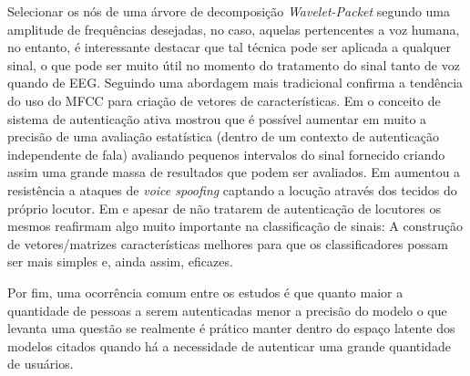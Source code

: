 Selecionar os nós de uma árvore de decomposição \textit{Wavelet-Packet} segundo uma amplitude de frequências desejadas, no caso, aquelas pertencentes a voz humana, no entanto, é interessante destacar que tal técnica pode ser aplicada a qualquer sinal, o que pode ser muito útil no momento do tratamento do sinal tanto de voz quando de EEG. Seguindo uma abordagem mais tradicional \cite{ali2022speech} confirma a tendência do uso do MFCC para criação de vetores de características. Em \cite{WOS:000525844000004} o conceito de sistema de autenticação ativa mostrou que é possível aumentar em muito a precisão de uma avaliação estatística (dentro de um contexto de autenticação independente de fala) avaliando pequenos intervalos do sinal fornecido criando assim uma grande massa de resultados que podem ser avaliados. Em \cite{10.1145/3448113} aumentou a resistência a ataques de \textit{voice spoofing} captando a locução através dos tecidos do próprio locutor. Em \cite{furlan2021caracterizacao} e \cite{9744556} apesar de não tratarem de autenticação de locutores os mesmos reafirmam algo muito importante na classificação de sinais: A construção de vetores/matrizes características melhores para que os classificadores possam ser mais simples e, ainda assim, eficazes.
			

			\par Por fim, uma ocorrência comum entre os estudos é que quanto maior a quantidade de pessoas a serem autenticadas menor a precisão do modelo o que levanta uma questão se realmente é prático manter dentro do espaço latente dos modelos citados quando há a necessidade de autenticar uma grande quantidade de usuários.
			